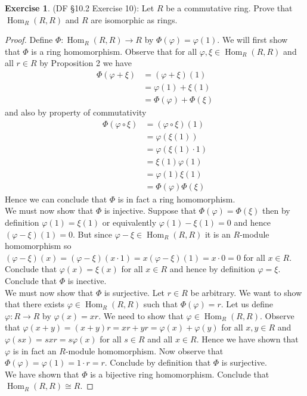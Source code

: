 \documentclass[8pt]{amsart}
\theoremstyle{plain}%
\theoremstyle{definition}
\newtheorem{exercise}{Exercise}[section]
\theoremstyle{remark}
\numberwithin{equation}{section}
\begin{document}
\begin{exercise}
(DF \S 10.2 Exercise 10): Let $R$ be a commutative ring. Prove that $\operatorname{Hom}_R(R, R)$ and $R$ are isomorphic as rings.
	\begin{proof}
		Define $\Phi : \operatorname{Hom}_R(R, R) \to R$ by $\Phi(\varphi) = \varphi(1)$. We will first show that $\Phi$ is a ring homomorphism. Observe that for all $\varphi, \xi \in \operatorname{Hom}_R(R, R)$ and all $r \in R$ by Proposition 2 we have
		\begin{align*}
			\Phi(\varphi + \xi) &= (\varphi + \xi)(1)\\
			&= \varphi(1) + \xi(1)\\
			&= \Phi(\varphi) + \Phi(\xi)
		\end{align*}
		and also by property of commutativity
		\begin{align*}
			\Phi(\varphi \circ \xi) &= (\varphi \circ \xi)(1)\\
			&= \varphi(\xi(1))\\
			&= \varphi(\xi(1) \cdot 1)\\
			&= \xi(1) \varphi(1)\\
			&= \varphi(1) \xi(1)\\
			&= \Phi(\varphi) \Phi(\xi)
		\end{align*}
		Hence we can conclude that $\Phi$ is in fact a ring homomorphism.\\

		We must now show that $\Phi$ is injective. Suppose that $\Phi(\varphi) = \Phi(\xi)$ then by definition $\varphi(1) = \xi(1)$ or equivalently $\varphi(1) - \xi(1) = 0$ and hence $(\varphi - \xi)(1) = 0$. But since $\varphi - \xi \in \operatorname{Hom}_R(R, R)$ it is an $R$-module homomorphism so $(\varphi - \xi)(x) = (\varphi - \xi)(x \cdot 1) = x(\varphi - \xi)(1) = x \cdot 0 = 0$ for all $x \in R$. Conclude that $\varphi(x) = \xi(x)$ for all $x \in R$ and hence by definition $\varphi = \xi$. Conclude that $\Phi$ is inective.\\

		We must now show that $\Phi$ is surjective. Let $r \in R$ be arbitrary. We want to show that there exists $\varphi \in \operatorname{Hom}_R(R, R)$ such that $\Phi(\varphi) = r$. Let us define $\varphi : R \to R$ by $\varphi(x) = xr$. We need to show that $\varphi \in \operatorname{Hom}_R(R, R)$. Observe that $\varphi(x + y) = (x + y)r = xr + yr = \varphi(x) + \varphi(y)$ for all $x, y \in R$ and $\varphi(sx) = sxr = s\varphi(x)$ for all $s \in R$ and all $x \in R$. Hence we have shown that $\varphi$ is in fact an $R$-module homomorphism. Now observe that $\Phi(\varphi) = \varphi(1) = 1 \cdot r = r$. Conclude by definition that $\Phi$ is surjective.\\

		We have shown that $\Phi$ is a bijective ring homomorphism. Conclude that $\operatorname{Hom}_R(R, R) \cong R$.
	\end{proof}
\end{exercise}
\end{document}
